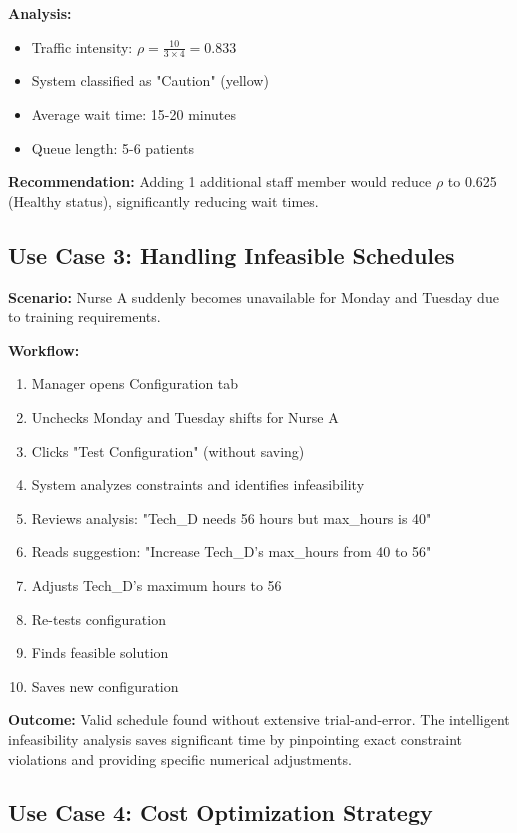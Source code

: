 \documentclass[12pt,a4paper]{article}
\begin{document}
\textbf{Analysis:}
\begin{itemize}
    \item Traffic intensity: $\rho = \frac{10}{3 \times 4} = 0.833$
    \item System classified as "Caution" (yellow)
    \item Average wait time: 15-20 minutes
    \item Queue length: 5-6 patients
\end{itemize}

\textbf{Recommendation:} Adding 1 additional staff member would reduce $\rho$ to 0.625 (Healthy status), significantly reducing wait times.

\subsection{Use Case 3: Handling Infeasible Schedules}
\label{subsec:usecase3}

\textbf{Scenario:} Nurse A suddenly becomes unavailable for Monday and Tuesday due to training requirements.

\textbf{Workflow:}
\begin{enumerate}
    \item Manager opens Configuration tab
    \item Unchecks Monday and Tuesday shifts for Nurse A
    \item Clicks "Test Configuration" (without saving)
    \item System analyzes constraints and identifies infeasibility
    \item Reviews analysis: "Tech\_D needs 56 hours but max\_hours is 40"
    \item Reads suggestion: "Increase Tech\_D's max\_hours from 40 to 56"
    \item Adjusts Tech\_D's maximum hours to 56
    \item Re-tests configuration
    \item Finds feasible solution
    \item Saves new configuration
\end{enumerate}

\textbf{Outcome:} Valid schedule found without extensive trial-and-error. The intelligent infeasibility analysis saves significant time by pinpointing exact constraint violations and providing specific numerical adjustments.

\subsection{Use Case 4: Cost Optimization Strategy}
\label{subsec:usecase4}
\end{document}
